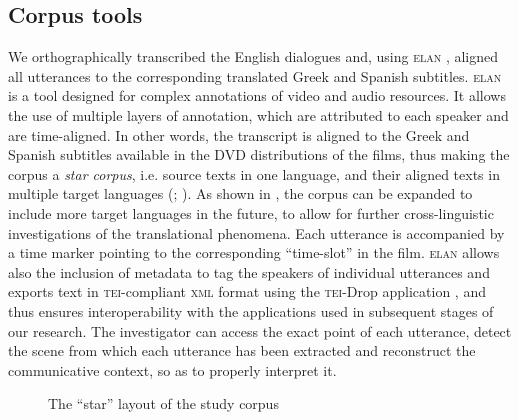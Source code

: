 \documentclass[output=paper]{LSP/langsci}
\begin{document}
\subsection{Corpus tools} \label{sec:2:3:2}

We orthographically transcribed the English dialogues and, using \textsc{elan} \citep{Brugman2004}, aligned all utterances to the corresponding translated Greek and Spanish subtitles. \textsc{elan} is a tool designed for complex annotations of video and audio resources. It allows the use of multiple layers of annotation, which are attributed to each speaker and are time-aligned. In other words, the transcript is aligned to the Greek and Spanish subtitles available in the DVD distributions of the films, thus making the corpus a \textit{star corpus}, i.e. source texts in one language, and their aligned texts in multiple target languages (\citealt[140--141]{Johansson2003}; \citealt[260]{Saridakis2010}). As shown in , the corpus can be expanded to include more target languages in the future, to allow for further cross-linguistic investigations of the translational phenomena. Each utterance is accompanied by a time marker pointing to the corresponding “time-slot” in the film. \textsc{elan} allows also the inclusion of metadata to tag the speakers of individual utterances and exports text in \textsc{tei}-compliant \textsc{xml} format using the \textsc{tei}-\textsc{D}rop application \citep{Schmidt2011}, and thus ensures interoperability with the applications used in subsequent stages of our research. The investigator can access the exact point of each utterance, detect the scene from which each utterance has been extracted and reconstruct the communicative context, so as to properly interpret it.

\begin{figure}
	
	
\caption{The “star” layout of the study corpus} \label{fig:2:1}
\end{figure}
\end{document}
